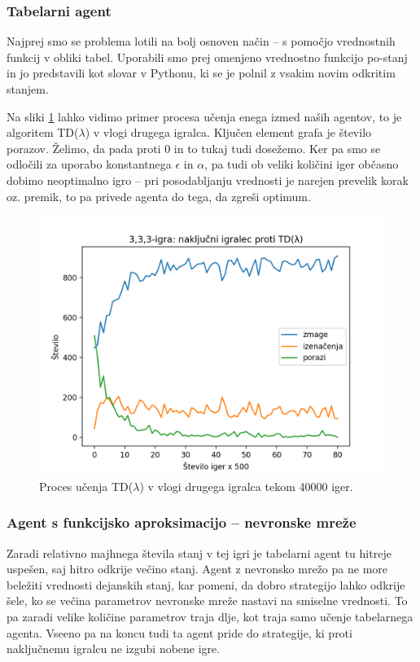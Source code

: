 \documentclass[12pt,a4paper]{amsart}
\theoremstyle{definition} %
\theoremstyle{plain} %
\begin{document}
\subsubsection{Tabelarni agent}
Najprej smo se problema lotili na bolj osnoven način -- s pomočjo vrednostnih funkcij v obliki tabel. 
Uporabili smo prej omenjeno vrednostno funkcijo po-stanj in jo predstavili kot slovar v Pythonu, ki 
se je polnil z vsakim novim odkritim stanjem.

Na sliki \ref{graf:1} lahko vidimo primer procesa učenja enega izmed naših agentov, to je algoritem 
TD($\lambda$) v vlogi drugega igralca. Ključen element grafa je število porazov. Želimo, da pada 
proti $0$ in to tukaj tudi dosežemo. Ker pa smo se odločili za uporabo konstantnega $\epsilon$ in 
$\alpha$, pa tudi ob veliki količini iger občasno dobimo neoptimalno igro -- pri posodabljanju 
vrednosti je narejen prevelik korak oz. premik, to pa privede agenta do tega, da zgreši optimum.

\begin{figure}[H]
    \includegraphics[scale=0.715]{../rezultati/tdl-333-40000-2.png}
    \caption{Proces učenja TD($\lambda$) v vlogi drugega igralca tekom 40000 iger.}
    \label{graf:1}
\end{figure}

\subsubsection{Agent s funkcijsko aproksimacijo -- nevronske mreže}
Zaradi relativno majhnega števila stanj v tej igri je tabelarni agent tu hitreje uspešen, saj hitro 
odkrije večino stanj. Agent z nevronsko mrežo pa ne more beležiti vrednosti dejanskih stanj, kar pomeni, 
da dobro strategijo lahko odkrije šele, ko se večina parametrov nevronske mreže nastavi na smiselne 
vrednosti. To pa zaradi velike količine parametrov traja dlje, kot traja samo učenje tabelarnega agenta.
Vseeno pa na koncu tudi ta agent pride do strategije, ki proti naključnemu igralcu ne izgubi nobene igre.
\end{document}

